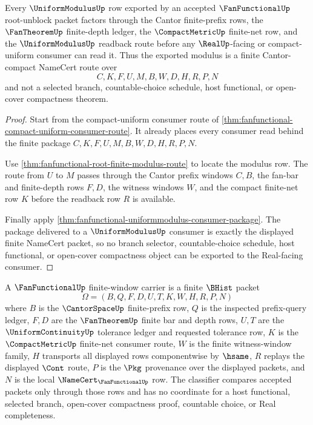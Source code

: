 \begin{theorem}
\label{thm:fanfunctional-cantor-compact-route}
Every $\UniformModulusUp$ row exported by an accepted $\FanFunctionalUp$
root-unblock packet factors through the Cantor finite-prefix rows, the
$\FanTheoremUp$ finite-depth ledger, the $\CompactMetricUp$ finite-net row,
and the $\UniformModulusUp$ readback route before any $\RealUp$-facing or
compact-uniform consumer can read it. Thus the exported modulus is a finite
Cantor-compact NameCert route over
$$
C,K,F,U,M,B,W,D,H,R,P,N
$$
and not a selected branch, countable-choice schedule, host functional, or
open-cover compactness theorem.
\end{theorem}
\begin{proof}
Start from the compact-uniform consumer route of
\autoref{thm:fanfunctional-compact-uniform-consumer-route}. It already
places every consumer read behind the finite package
$C,K,F,U,M,B,W,D,H,R,P,N$.

Use \autoref{thm:fanfunctional-root-finite-modulus-route} to locate the
modulus row. The route from $U$ to $M$ passes through the Cantor prefix
windows $C,B$, the fan-bar and finite-depth rows $F,D$, the witness windows
$W$, and the compact finite-net row $K$ before the readback row $R$ is
available.

Finally apply
\autoref{thm:fanfunctional-uniformmodulus-consumer-package}. The package
delivered to a $\UniformModulusUp$ consumer is exactly the displayed finite
NameCert packet, so no branch selector, countable-choice schedule, host
functional, or open-cover compactness object can be exported to the
Real-facing consumer.
\end{proof}

\begin{definition}
\label{def:fanfunctional-finite-window-carrier}
A $\FanFunctionalUp$ finite-window carrier is a finite $\BHist$ packet
$$
\Omega=(B,Q,F,D,U,T,K,W,H,R,P,N)
$$
where $B$ is the $\CantorSpaceUp$ finite-prefix row, $Q$ is the inspected prefix-query ledger, $F,D$ are the $\FanTheoremUp$ finite bar and depth rows, $U,T$ are the $\UniformContinuityUp$ tolerance ledger and requested tolerance row, $K$ is the $\CompactMetricUp$ finite-net consumer route, $W$ is the finite witness-window family, $H$ transports all displayed rows componentwise by $\hsame$, $R$ replays the displayed $\Cont$ route, $P$ is the $\Pkg$ provenance over the displayed packets, and $N$ is the local $\NameCert_{\FanFunctionalUp}$ row. The classifier compares accepted packets only through those rows and has no coordinate for a host functional, selected branch, open-cover compactness proof, countable choice, or Real completeness.
\end{definition}

